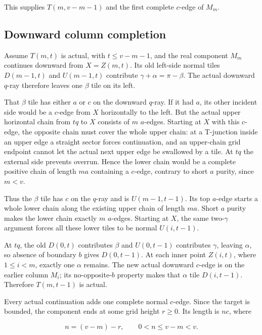 \documentclass[
  11pt,
  a4paper,
]{article}
\begin{document}
This supplies \(T(m,v-m-1)\) and the first complete \(c\)-edge of
\(M_m\).

\hypertarget{downward-column-completion}{%
\subsection{Downward column
completion}\label{downward-column-completion}}

Assume \(T(m,t)\) is actual, with \(t\le v-m-1\), and the real component
\(M_m\) continues downward from \(X=Z(m,t)\). Its old left-side normal
tiles \(D(m-1,t)\) and \(U(m-1,t)\) contribute
\(\gamma+\alpha=\pi-\beta\). The actual downward \(q\)-ray therefore
leaves one \(\beta\) tile on its left.

That \(\beta\) tile has either \(a\) or \(c\) on the downward \(q\)-ray.
If it had \(a\), its other incident side would be a \(c\)-edge from
\(X\) horizontally to the left. But the actual upper horizontal chain
from \(tq\) to \(X\) consists of \(m\) \(a\)-edges. Starting at \(X\)
with this \(c\)-edge, the opposite chain must cover the whole upper
chain: at a T-junction inside an upper edge a straight sector forces
continuation, and an upper-chain grid endpoint cannot let the actual
next upper edge be swallowed by a tile. At \(tq\) the external side
prevents overrun. Hence the lower chain would be a complete positive
chain of length \(ma\) containing a \(c\)-edge, contrary to short \(a\)
purity, since \(m<v\).

Thus the \(\beta\) tile has \(c\) on the \(q\)-ray and is
\(U(m-1,t-1)\). Its top \(a\)-edge starts a whole lower chain along the
existing upper chain of length \(ma\). Short \(a\) purity makes the
lower chain exactly \(m\) \(a\)-edges. Starting at \(X\), the same
two-\(\gamma\) argument forces all these lower tiles to be normal
\(U(i,t-1)\).

At \(tq\), the old \(D(0,t)\) contributes \(\beta\) and \(U(0,t-1)\)
contributes \(\gamma\), leaving \(\alpha\), so absence of boundary \(b\)
gives \(D(0,t-1)\). At each inner point \(Z(i,t)\), where \(1\le i<m\),
exactly one \(\alpha\) remains. The new actual downward \(c\)-edge is on
the earlier column \(M_i\); its no-opposite-\(b\) property makes that
\(\alpha\) tile \(D(i,t-1)\). Therefore \(T(m,t-1)\) is actual.

Every actual continuation adds one complete normal \(c\)-edge. Since the
target is bounded, the component ends at some grid height \(r\ge0\). Its
length is \(nc\), where

\[
n=(v-m)-r,\qquad 0<n\le v-m<v.
\]
\end{document}
